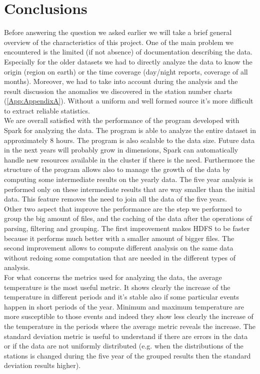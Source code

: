 \documentclass{vldb}
\begin{document}
\section{Conclusions}
\label{sec:con}
Before answering the question we asked earlier we will take a brief general overview of the characteristics of this project. One of the main problem we encountered is the limited (if not absence) of documentation describing the data. Especially for the older datasets we had to directly analyze the data to know the origin (region on earth) or the time coverage (day/night reports, coverage of all months). Moreover, we had to take into account during the analysis and the result discussion the anomalies we discovered in the station number charts (\ref{App:AppendixA}). Without a uniform and well formed source it's more difficult to extract reliable statistics.\\
We are overall satisfied with the performance of the program developed with Spark for analyzing the data. The program is able to analyze the entire dataset in approximately 8 hours. The program is also scalable to the data size. Future data in the next years will probably grow in dimensions, Spark can automatically handle new resources available in the cluster if there is the need. Furthermore the structure of the program allows also to manage the growth of the data by computing some intermediate results on the yearly data. The five year analysis is performed only on these intermediate results that are way smaller than the initial data. This feature removes the need to join all the data of the five years.\\
Other two aspect that improve the performance are the step we performed to group the big amount of files, and the caching of the data after the operations of parsing, filtering and grouping. The first improvement makes HDFS to be faster because it performs much better with a smaller amount of bigger files. The second improvement allows to compute different analysis on the same data without redoing some computation that are needed in the different types of analysis.\\

For what concerns the metrics used for analyzing the data, the average temperature is the most useful metric. It shows clearly the increase of the temperature in different periods and it's stable also if some particular events happen in short periods of the year. Minimum and maximum temperature are more susceptible to those events and indeed they show less clearly the increase of the temperature in the periods where the average metric reveals the increase. The standard deviation metric is useful to understand if there are errors in the data or if the data are not uniformly distributed (e.g. when the distributions of the stations is changed during the five year of the grouped results then the standard deviation results higher).
\end{document}
